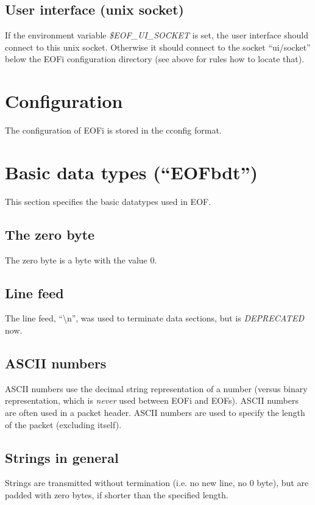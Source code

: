 \documentclass[12pt,a4paper]{book}
\begin{document}
\subsection{User interface (unix socket)}
\label{ui-socket}
If the environment variable \textit{\$EOF\_UI\_SOCKET} is set, the user
interface should connect to this unix socket. Otherwise it should connect
to the socket "`ui/socket"' below the EOFi configuration directory
(see above for rules how to locate that).
\section{Configuration}
The configuration of EOFi is stored in the cconfig\cite{cconfig} format.
\section{Basic data types ("`EOFbdt"')}
This section specifies the basic datatypes used in EOF.
\subsection{The zero byte}
The zero byte is a byte with the value 0.
\subsection{Line feed}
The line feed, "`\textbackslash{}n"', was used to terminate data
sections, but is \emph{DEPRECATED} now.
\subsection{ASCII numbers}
ASCII numbers use the decimal string representation of a number (versus
binary representation, which is \emph{never} used between EOFi and EOFs).
ASCII numbers are often used in a packet header.
ASCII numbers are used to specify the length of the packet (excluding itself).
\subsection{Strings in general}
Strings are transmitted without termination (i.e. no new line, no 0 byte),
but are padded with zero bytes, if shorter than the specified length.
\end{document}
